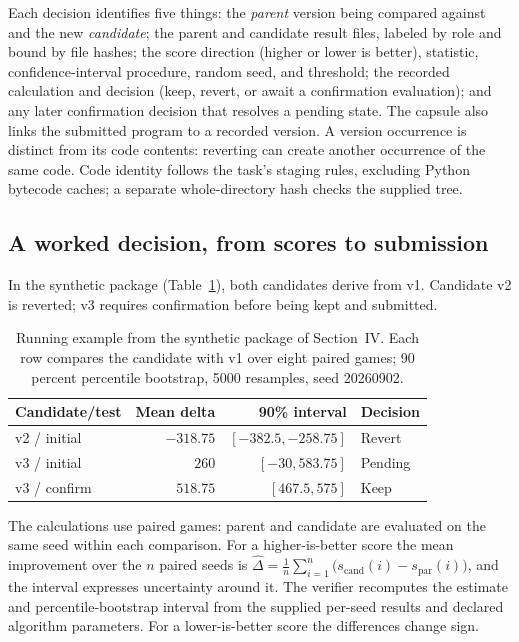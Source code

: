 \documentclass[conference]{IEEEtran}
\begin{document}
Each decision identifies five things: the \emph{parent} version being compared against and the new \emph{candidate}; the parent and candidate result files, labeled by role and bound by file hashes; the score direction (higher or lower is better), statistic, confidence-interval procedure, random seed, and threshold; the recorded calculation and decision (keep, revert, or await a confirmation evaluation); and any later confirmation decision that resolves a pending state. The capsule also links the submitted program to a recorded version. A version occurrence is distinct from its code contents: reverting can create another occurrence of the same code. Code identity follows the task's staging rules, excluding Python bytecode caches; a separate whole-directory hash checks the supplied tree.

\subsection{A worked decision, from scores to submission}
In the synthetic package (Table~\ref{tab:example}), both candidates derive from v1. Candidate v2 is reverted; v3 requires confirmation before being kept and submitted.

\begin{table}[ht]
\caption{Running example from the synthetic package of Section~IV. Each row compares the candidate with v1 over eight paired games; 90 percent percentile bootstrap, 5000 resamples, seed 20260902.}
\label{tab:example}
\centering\small
\begin{tabular}{lrrl}
\toprule
Candidate/test & Mean delta & 90\% interval & Decision\\
\midrule
v2 / initial & $-318.75$ & $[-382.5,-258.75]$ & Revert\\
v3 / initial & $260$ & $[-30,583.75]$ & Pending\\
v3 / confirm & $518.75$ & $[467.5,575]$ & Keep\\
\bottomrule
\end{tabular}
\end{table}

The calculations use paired games: parent and candidate are evaluated on the same seed within each comparison. For a higher-is-better score the mean improvement over the $n$ paired seeds is $\widehat{\Delta}=\frac{1}{n}\sum_{i=1}^{n}\bigl(s_{\mathrm{cand}}(i)-s_{\mathrm{par}}(i)\bigr)$, and the interval expresses uncertainty around it. The verifier recomputes the estimate and percentile-bootstrap interval from the supplied per-seed results and declared algorithm parameters. For a lower-is-better score the differences change sign.
\end{document}
